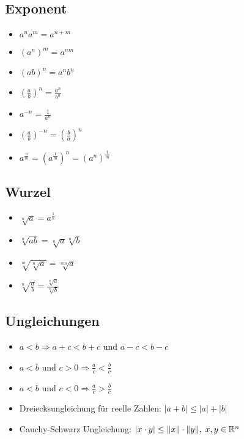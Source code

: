 \begin{multicols}{2}
\subsection{Exponent}
\begin{itemize}[leftmargin=*]
  \item $a^n a^m = a^{n + m}$
  \item $(a^n)^m = a^{nm}$
  \item $(ab)^n = a^n b^n$
  \item $\left( \frac{a}{b} \right)^n = \frac{a^n}{b^n}$
  \item $a^{-n} = \frac{1}{a^n}$
  \item $\left( \frac{a}{b} \right)^{-n} = \left( \frac{b}{a} \right)^n$
  \item $a^\frac{n}{m} = (a^\frac{1}{m})^n = (a^n)^\frac{1}{m}$
\end{itemize}
\columnbreak

\subsection{Wurzel}
\begin{itemize}[leftmargin=*]
  \item $\sqrt[n]{a} = a^\frac{1}{n}$
  \item $\sqrt[n]{ab} = \sqrt[n]{a} \sqrt[n]{b}$
  \item $\sqrt[m]{\sqrt[n]{a}} = \sqrt[nm]{a}$
  \item $\sqrt[n]{\frac{a}{b}} = \frac{\sqrt[n]{a}}{\sqrt[n]{b}}$
\end{itemize}

\end{multicols}

\subsection{Ungleichungen}
\begin{itemize}[leftmargin=*]
  \item $a < b \Rightarrow a + c < b + c$ und $a - c < b - c$
  \item $a < b$ und $c > 0 \Rightarrow \frac{a}{c} < \frac{b}{c}$
  \item $a < b$ und $c < 0 \Rightarrow \frac{a}{c} > \frac{b}{c}$ 
  \item Dreiecksungleichung für reelle Zahlen: $|a+b| \le |a|{+}|b|$ %
  \item Cauchy-Schwarz Ungleichung: $|x \cdot y| \leq \|x\| \cdot \|y\|, \; x,y \in \mathbb{R}^n$
\end{itemize}

